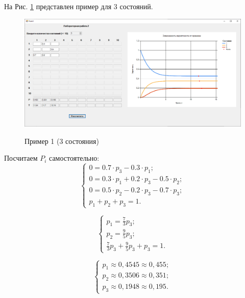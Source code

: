 На Рис. \ref{fig1:image} представлен пример для 3 состояний. 

\begin{figure}[h]
	\begin{center}
		{\includegraphics[scale = 0.42]{img/ex1_3.png}}
		\caption{Пример 1 (3 состояния)}
		\label{fig1:image}
	\end{center}
\end{figure}

Посчитаем $P_i$ самостоятельно:
\begin{equation}
	\left\{\begin{array}{l}
		0 = 0.7\cdot p_3 - 0.3\cdot p_1;\\
		0 = 0.3\cdot p_1 + 0.2\cdot p_3 - 0.5\cdot p_2;\\
		0 = 0.5\cdot p_2 - 0.2\cdot p_3 - 0.7\cdot p_3;\\
		p_1 + p_2 + p_3 = 1.
	\end{array}\right.
\end{equation}

\begin{equation}
	\left\{\begin{array}{l}
		p_1 = \frac{7}{3} p_3;\\
		p_2 = \frac{9}{5} p_3;\\
		\frac{7}{3} p_3 + \frac{9}{5} p_3 + p_3 = 1.
	\end{array}\right.
\end{equation}

\begin{equation}
	\left\{\begin{array}{l}
		p_1 \approx 0,4545 \approx 0,455;\\
		p_2 \approx 0,3506 \approx 0,351;\\
		p_3 \approx 0,1948 \approx 0,195.
	\end{array}\right.
\end{equation}

